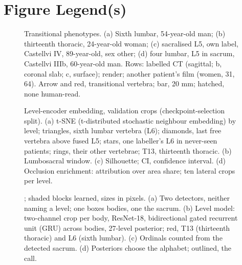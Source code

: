 \clearpage
\section*{Figure Legend(s)}
\makeatletter{}\makeatother

\begin{figure}[tbh!]
\centering
{}
\caption{Transitional phenotypes. (a) Sixth lumbar, 54-year-old man; (b) thirteenth thoracic, 24-year-old woman; (c) sacralised L5, own label, Castellvi IV, 89-year-old, sex other; (d) four lumbar, L5 in sacrum, Castellvi IIIb, 60-year-old man. Rows: labelled CT (sagittal; b, coronal slab; c, surface); render; another patient's film (women, 31, 64). Arrow and red, transitional vertebra; bar, 20 mm; hatched, none human-read.\label{fig:phenotypes}}
\end{figure}

\begin{figure}[tbh!]
\centering
{}
\caption{Level-encoder embedding, validation crops (checkpoint-selection split). (a) t-SNE (t-distributed stochastic neighbour embedding) by level; triangles, sixth lumbar vertebra (L6); diamonds, last free vertebra above fused L5; stars, one labeller's L6 in never-seen patients; rings, their other vertebrae; T13, thirteenth thoracic. (b) Lumbosacral window. (c) Silhouette; CI, confidence interval. (d) Occlusion enrichment: attribution over area share; ten lateral crops per level.\label{fig:embedding}}
\end{figure}

\begin{figure}[tbh!]
\centering
{}
\caption{\netname{}; shaded blocks learned, sizes in pixels. (a) Two detectors, neither naming a level; one boxes bodies, one the sacrum. (b) Level model: two-channel crop per body, ResNet-18, bidirectional gated recurrent unit (GRU) across bodies, 27-level posterior; red, T13 (thirteenth thoracic) and L6 (sixth lumbar). (c) Ordinals counted from the detected sacrum. (d) Posteriors choose the alphabet; outlined, the call.\label{fig:network}}
\end{figure}

